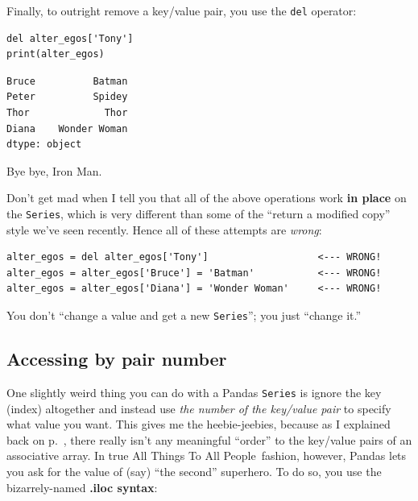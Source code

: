 Finally, to outright remove a key/value pair, you use the \texttt{del}
operator:

\begin{Verbatim}[fontsize=\small,samepage=true,frame=single,framesep=3mm]
del alter_egos['Tony']
print(alter_egos)
\end{Verbatim}

\begin{Verbatim}[fontsize=\small,samepage=true,frame=leftline,framesep=5mm,framerule=1mm]
Bruce          Batman
Peter          Spidey
Thor             Thor
Diana    Wonder Woman
dtype: object
\end{Verbatim}

Bye bye, Iron Man.


Don't get mad when I tell you that all of the above operations work
\textbf{in place} on the \texttt{Series}, which is very different than some of
the ``return a modified copy'' style we've seen recently. Hence all of these
attempts are \textit{wrong}:

\begin{Verbatim}[fontsize=\small,samepage=true,frame=single,framesep=3mm]
alter_egos = del alter_egos['Tony']                   <--- WRONG!
alter_egos = alter_egos['Bruce'] = 'Batman'           <--- WRONG!
alter_egos = alter_egos['Diana'] = 'Wonder Woman'     <--- WRONG!
\end{Verbatim}

You don't ``change a value and get a new \texttt{Series}''; you just
``change it.''

\subsection{Accessing by pair number}



One slightly weird thing you can do with a Pandas \texttt{Series} is ignore the
key (index) altogether and instead use \textit{the number of the key/value
pair} to specify what value you want. This gives me the heebie-jeebies, because
as I explained back on p.~\pageref{assocArraysUnordered}, there really isn't
any meaningful ``order'' to the key/value pairs of an associative array. In
true All Things To All People\texttrademark~fashion, however, Pandas lets you
ask for the value of (say) ``the second'' superhero. To do so, you use the
bizarrely-named \textbf{.iloc syntax}:

